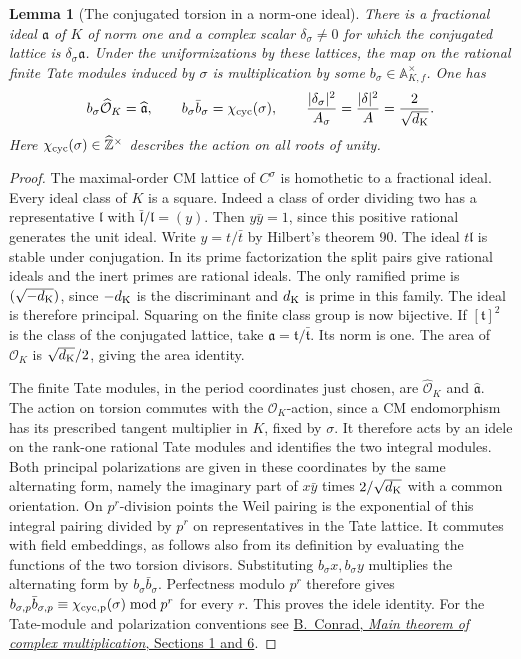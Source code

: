 \documentclass[a4paper,11pt]{article}
\newtheorem{lemma}[proposition]{Lemma}
\theoremstyle{definition}
\theoremstyle{remark}
\numberwithin{equation}{section}
\begin{document}
\begin{lemma}[The conjugated torsion in a norm-one ideal]
\leavevmode\label{lem:torsionidele864}
There is a fractional ideal \(\mathfrak a\) of \(K\) of norm
one and a complex scalar \(\delta_\sigma\ne0\) for which the
conjugated lattice is \(\delta_\sigma\mathfrak a\). Under the
uniformizations by these lattices, the map on the rational
finite Tate modules induced by \(\sigma\) is multiplication by
some \(b_\sigma\in\mathbb A_{K,f}^{\times}\). One has
\[
 b_\sigma\widehat{\mathcal O}_K=\widehat{\mathfrak a},\qquad
 b_\sigma\bar b_\sigma=\chi_{\rm cyc}(\sigma),\qquad
 \frac{|\delta_\sigma|^2}{A_\sigma}
       =\frac{|\delta|^2}{A}=\frac{2}{\sqrt{d_{\rm K}}}.
\]
Here \(\chi_{\rm cyc}(\sigma)\in\widehat{\mathbb Z}^{\times}\)
describes the action on all roots of unity.
\end{lemma}
\begin{proof}
The maximal-order CM lattice of \(C^\sigma\) is homothetic
to a fractional ideal. Every ideal class of \(K\) is a square.
Indeed a class of order dividing two has a representative
\(\mathfrak l\) with \(\bar{\mathfrak l}/\mathfrak l=(y)\).
Then \(y\bar y=1\), since this positive rational generates the
unit ideal. Write \(y=t/\bar t\) by Hilbert's theorem 90.
The ideal \(t\mathfrak l\) is stable under conjugation. In its
prime factorization the split pairs give rational ideals and
the inert primes are rational ideals. The only ramified prime
is \((\sqrt{-d_{\rm K}})\), since \(-d_{\rm K}\) is the
discriminant and \(d_{\rm K}\) is prime in this family.
The ideal is therefore principal. Squaring on the finite
class group is now bijective. If \([\mathfrak t]^2\) is the
class of the conjugated lattice, take
\(\mathfrak a=\mathfrak t/\bar{\mathfrak t}\).
Its norm is one. The area of \(\mathcal O_K\) is
\(\sqrt{d_{\rm K}}/2\), giving the area identity.

The finite Tate modules, in the period coordinates just chosen,
are \(\widehat{\mathcal O}_K\) and \(\widehat{\mathfrak a}\).
The action on torsion commutes with the \(\mathcal O_K\)-action,
since a CM endomorphism has its prescribed tangent multiplier
in \(K\), fixed by \(\sigma\). It therefore acts by an idele
on the rank-one rational Tate modules and identifies the two
integral modules. Both principal polarizations are given in
these coordinates by the same alternating form, namely the
imaginary part of \(x\bar y\) times \(2/\sqrt{d_{\rm K}}\)
with a common orientation. On \(p^r\)-division points the
Weil pairing is the exponential of this integral pairing
divided by \(p^r\) on representatives in the Tate lattice.
It commutes with field embeddings, as follows also from its
definition by evaluating the functions of the two torsion
divisors. Substituting \(b_\sigma x,b_\sigma y\) multiplies
the alternating form by \(b_\sigma\bar b_\sigma\).
Perfectness modulo \(p^r\) therefore gives
\(b_{\sigma,p}\bar b_{\sigma,p}\equiv\chi_{\rm cyc,p}(\sigma)
\bmod p^r\) for every \(r\). This proves the idele identity.
For the Tate-module and polarization conventions see
\href{https://math.stanford.edu/~conrad/vigregroup/vigre04/mainthm.pdf}
{B.~Conrad, \emph{Main theorem of complex multiplication}, Sections 1 and 6}.
\end{proof}
\end{document}
